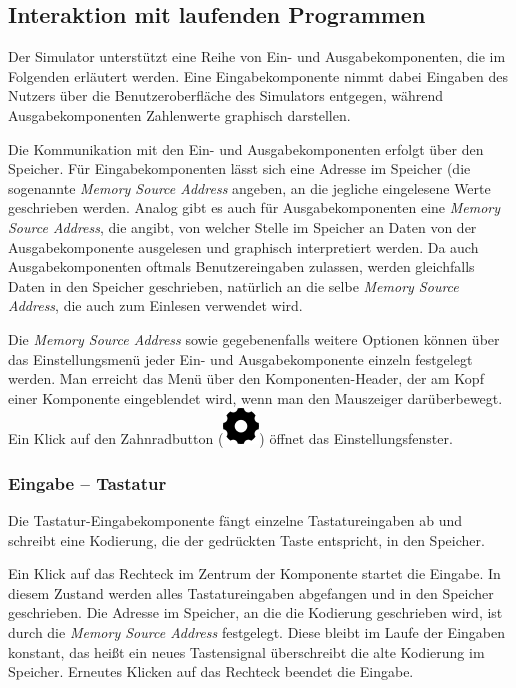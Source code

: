 \subsection{Interaktion mit laufenden Programmen}

Der Simulator unterstützt eine Reihe von Ein- und Ausgabekomponenten, die im Folgenden erläutert werden. Eine Eingabekomponente nimmt dabei Eingaben des Nutzers über die Benutzeroberfläche des Simulators entgegen, während Ausgabekomponenten Zahlenwerte graphisch darstellen.

Die Kommunikation mit den Ein- und Ausgabekomponenten erfolgt über den Speicher. Für Eingabekomponenten lässt sich eine Adresse im Speicher (die sogenannte \textit{Memory Source Address} angeben, an die jegliche eingelesene Werte geschrieben werden. Analog gibt es auch für Ausgabekomponenten eine \textit{Memory Source Address}, die angibt, von welcher Stelle im Speicher an Daten von der Ausgabekomponente ausgelesen und graphisch interpretiert werden. Da auch Ausgabekomponenten oftmals Benutzereingaben zulassen, werden gleichfalls Daten in den Speicher geschrieben, natürlich an die selbe \textit{Memory Source Address}, die auch zum Einlesen verwendet wird.

Die \textit{Memory Source Address} sowie gegebenenfalls weitere Optionen können über das Einstellungsmenü jeder Ein- und Ausgabekomponente einzeln festgelegt werden. Man erreicht das Menü über den Komponenten-Header, der am Kopf einer Komponente eingeblendet wird, wenn man den Mauszeiger darüberbewegt. Ein Klick auf den Zahnradbutton (\includegraphics[scale=0.22]{Images/SettingsIcon}) öffnet das Einstellungsfenster.

\subsubsection{Eingabe -- Tastatur}

Die Tastatur-Eingabekomponente fängt einzelne Tastatureingaben ab und schreibt eine Kodierung, die der gedrückten Taste entspricht, in den Speicher.

Ein Klick auf das Rechteck im Zentrum der Komponente startet die Eingabe. In diesem Zustand werden alles Tastatureingaben abgefangen und in den Speicher geschrieben. Die Adresse im Speicher, an die die Kodierung geschrieben wird, ist durch die \textit{Memory Source Address} festgelegt. Diese bleibt im Laufe der Eingaben konstant, das heißt ein neues Tastensignal überschreibt die alte Kodierung im Speicher. Erneutes Klicken auf das Rechteck beendet die Eingabe. 

